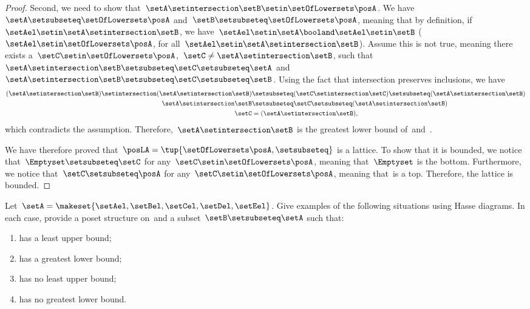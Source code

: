 \begin{proof}
    Second, we need to show that~$\setA \setintersection \setB\setin \setOfLowersets \posA$.
    We have~$\setA \setsubseteq \setOfLowersets \posA$ and~$\setB\setsubseteq \setOfLowersets \posA$, meaning that by definition, if~$\setAel\setin \setA\setintersection \setB$, we have~$\setAel \setin \setA\booland \setAel\setin \setB$ ($\setAel\setin \setOfLowersets \posA$, for all~$\setAel\setin \setA \setintersection \setB$).
    Assume this is not true, meaning there exists a~$\setC\setin \setOfLowersets \posA$,~$\setC\neq \setA\setintersection \setB$, such that~$\setA\setintersection \setB\setsubseteq \setC\setsubseteq \setA$ and~$\setA\setintersection \setB\setsubseteq \setC\setsubseteq \setB$.
    Using the fact that intersection preserves inclusions, we have
    \begin{equation}
        \begin{aligned}
            (\setA\setintersection \setB)
            \setintersection (\setA\setintersection \setB) & \setsubseteq (\setC \setintersection \setC) \setsubseteq (\setA\setintersection \setB) \\
            \setA\setintersection \setB                    & \setsubseteq \setC\setsubseteq (\setA\setintersection \setB) \\
            \setC                                          & =(\setA\setintersection \setB),
        \end{aligned}
    \end{equation}
    which contradicts the assumption.
    Therefore,~$\setA\setintersection \setB$ is the greatest lower bound of~\setA and~\setB.

    We have therefore proved that~$\posLA=\tup{\setOfLowersets \posA,\setsubseteq}$ is a lattice.
    To show that it is bounded, we notice that~$\Emptyset \setsubseteq \setC$ for any~$\setC\setin \setOfLowersets \posA$, meaning that~$\Emptyset$ is the bottom.
    Furthermore, we notice that~$\setC\setsubseteq \posA$ for any~$\setC\setin \setOfLowersets \posA$, meaning that~\posA is a top.
    Therefore, the lattice is bounded.
\end{proof}

\vfill

\begin{gradedexercise}
    \label{ex:UpperLowerBounds}
    Let~$\setA = \makeset{\setAel, \setBel, \setCel, \setDel, \setEel }$.
    Give examples of the following situations using Hasse diagrams.
    In each case, provide a poset structure on~\setA and a subset~$\setB \setsubseteq \setA$ such that:
    \begin{enumerate}
        \item \setB has a least upper bound;
        \item \setB has a greatest lower bound;
        \item \setB has no least upper bound;
        \item \setB has no greatest lower bound.
    \end{enumerate}
\end{gradedexercise}

